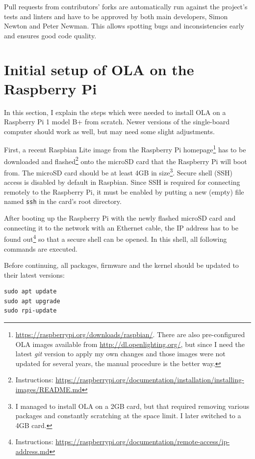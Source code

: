 Pull requests from contributors' forks are automatically run against the
project's tests and linters and have to be approved by both main
developers, Simon Newton and Peter Newman. This allows spotting bugs and
inconsistencies early and ensures good code quality.

\section{Initial setup of OLA on the Raspberry
Pi}\label{initial-setup-of-ola-on-the-raspberry-pi}

In this section, I explain the steps which were needed to install OLA on
a Raspberry Pi 1 model B+ from scratch. Newer versions of the
single-board computer should work as well, but may need some slight
adjustments.

First, a recent Raspbian Lite image from the Raspberry Pi
homepage\footnote{\url{https://raspberrypi.org/downloads/raspbian/}.
  There are also pre-configured OLA images available from
  \url{http://dl.openlighting.org/}, but since I need the latest
  \emph{git} version to apply my own changes and those images were not
  updated for several years, the manual procedure is the better way.}
has to be downloaded and flashed\footnote{Instructions:
  \url{https://raspberrypi.org/documentation/installation/installing-images/README.md}}
onto the microSD card that the Raspberry Pi will boot from. The microSD
card should be at least 4GB in size\footnote{I managed to install OLA on
  a 2GB card, but that required removing various packages and constantly
  scratching at the space limit. I later switched to a 4GB card.}.
Secure shell (SSH) access is disabled by default in Raspbian. Since SSH
is required for connecting remotely to the Raspberry Pi, it must be
enabled by putting a new (empty) file named \colorbox{WhiteSmoke}{\lstinline!ssh!} in the
card's root directory.

After booting up the Raspberry Pi with the newly flashed microSD card
and connecting it to the network with an Ethernet cable, the IP address
has to be found out\footnote{Instructions:
  \url{https://raspberrypi.org/documentation/remote-access/ip-address.md}}
so that a secure shell can be opened. In this shell, all following
commands are executed.

Before continuing, all packages, firmware and the kernel should be
updated to their latest versions:

\begin{lstlisting}[style=myBash]
sudo apt update
sudo apt upgrade
sudo rpi-update
\end{lstlisting}


